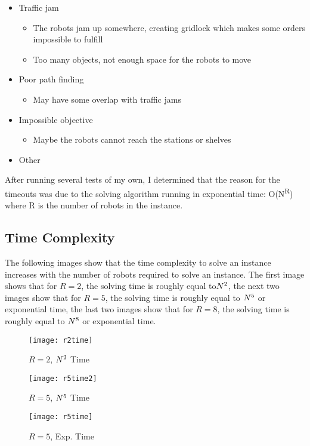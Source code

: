 \documentclass[12pt]{article}
\begin{document}
\begin{itemize}[noitemsep]
\item	Traffic jam
	\begin{itemize}[noitemsep]
	\item	The robots jam up somewhere, creating gridlock which makes some orders impossible to fulfill
	\item	Too many objects, not enough space for the robots to move
	\end{itemize}
\item	Poor path finding
	\begin{itemize}[noitemsep]
	\item	May have some overlap with traffic jams
	\end{itemize}
\item	Impossible objective
	\begin{itemize}[noitemsep]
	\item	Maybe the robots cannot reach the stations or shelves
	\end{itemize} 
\item	Other
\end{itemize}

After running several tests of my own, I determined that the reason for the timeouts was due to the solving algorithm running in exponential time: O(N\textsuperscript{R}) where R is the number of robots in the instance. 

\subsection*{Time Complexity}

The following images show that the time complexity to solve an instance increases with the number of robots required to solve an instance. The first image shows that for $R=2$, the solving time is roughly equal to$ N\textsuperscript{2}$, the next two images show that for $R=5$, the solving time is roughly equal to $N\textsuperscript{5}$ or exponential time, the last two images show that for $R=8$, the solving time is roughly equal to $N\textsuperscript{8}$ or exponential time.


\begin{figure}[!htb]
\texttt{[image: r2time]}
\caption{$R=2$, $N\textsuperscript{2}$ Time}
\label{fig:Figure1}
\end{figure}

\begin{figure}[!htb]
  \texttt{[image: r5time2]}
  \caption{$R=5$, $N\textsuperscript{5}$ Time}\label{fig:Figure 2}
\endminipage\hfill
{}
  \texttt{[image: r5time]}
  \caption{$R=5$, Exp. Time}\label{fig:Figure 3}
\endminipage\hfill
\end{figure}
\end{document}
